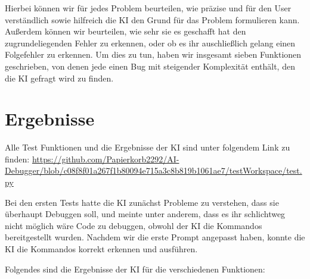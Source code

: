 \documentclass[a4paper,12pt,ngerman]{scrartcl}
\begin{document}
Hierbei können wir für jedes Problem beurteilen, wie präzise und für den User verständlich sowie hilfreich die KI den Grund für das Problem formulieren kann. Außerdem können wir beurteilen, wie sehr sie es geschafft hat den zugrundeliegenden Fehler zu erkennen, oder ob es ihr auschließlich gelang einen Folgefehler zu erkennen. Um dies zu tun, haben wir insgesamt sieben Funktionen geschrieben, von denen jede einen Bug mit steigender Komplexität enthält, den die KI gefragt wird zu finden.

\section{Ergebnisse}

Alle Test Funktionen und die Ergebnisse der KI sind unter folgendem Link zu finden: \url{https://github.com/Papierkorb2292/AI-Debugger/blob/c08f8f01a267f1b80094e715a3c8b819b1061ae7/testWorkspace/test.py}

Bei den ersten Tests hatte die KI zunächst Probleme zu verstehen, dass sie überhaupt Debuggen soll, und meinte unter anderem, dass es ihr schlichtweg nicht möglich wäre Code zu debuggen, obwohl der KI die Kommandos bereitgestellt wurden. Nachdem wir die erste Prompt angepasst haben, konnte die KI die Kommandos korrekt erkennen und ausführen.

Folgendes sind die Ergebnisse der KI für die verschiedenen Funktionen:
\end{document}
